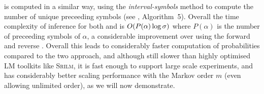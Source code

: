 \begin{algorithm}[t]
  \caption{%
$\nlplus{\dotpatdot}$, using forward \CST 
    \label{alg:n1plusfb_wt}}
\footnotesize
  \begin{algorithmic}[1]
    \Function{\nlplusfrontbacklname}{$\tf, \nf, \alpha$} 
        \If{$\depth{\tf}{\nf} > |\alpha|$}   
        \Else 
            \EndFor
          \EndIf
      \State {}
    \EndFunction
  \end{algorithmic}
\end{algorithm}

\nlplusbacklname is computed in a similar way, using the \emph{interval-symbols} method to compute the number of unique preceeding symbols (see \supp, Algorithm~5).
Overall the time complexity of inference for both \nlplusbacklname and \nlplusfrontbacklname is $O(P(\alpha) \log \sigma)$ where $P(\alpha)$ is the number of preceeding symbols of $\alpha$, a considerable improvement over \nlplusfrontbackname using the forward and reverse \CSTs.
Overall this leads to considerably faster computation of \ngram probabilities compared to the two \CST approach, and although still slower than highly optimised LM toolkits like \textsc{Srilm}, it is fast enough to support large scale experiments, and has considerably better scaling performance with the Markov order $m$ (even allowing unlimited order), as we will now demonstrate.


